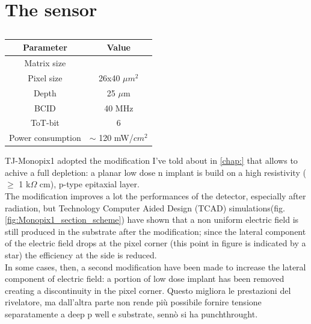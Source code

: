 \section{The sensor}
    \begin{table}
        \begin{center}
        \begin{tabular}{| c |c |}
        \hline
        Parameter & Value\\
        \hline
        \hline
        Matrix size & \\
        Pixel size & 26x40 $\mu m^2$\\
        Depth & 25 $\mu$m \\
        BCID & 40 MHz \\
        ToT-bit & 6 \\
        Power consumption & $\sim$ 120 mW/$cm^2$\\
        \hline
        \end{tabular}
        \caption{}
        \label{tab:LF-TJ-Monopix}
        \end{center}
    \end{table}
    TJ-Monopix1 adopted the modification I've told about in \ref{chap:} that allows to achive a full depletion: a planar low dose n implant is build on a high resistivity ($\geq $ 1 k$\Omega$ cm), p-type epitaxial layer.\\
    The modification improves a lot the performances of the detector, especially after radiation, but  Technology Computer Aided Design (TCAD) simulations(fig.\ref{fig:Monopix1_section_scheme}) have shown that a non uniform electric field is still produced in the substrate after the modification; since the lateral component of the electric field drops at the pixel corner (this point in figure is indicated by a star) the efficiency at the side is reduced. \\
    In some cases, then, a second modification have been made to increase the lateral component of electric field: a portion of low dose implant has been removed creating a discontinuity in the pixel corner. Questo migliora le prestazioni del rivelatore, ma dall'altra parte non rende più possibile fornire tensione separatamente a deep p well e substrate, sennò si ha punchthrought.
